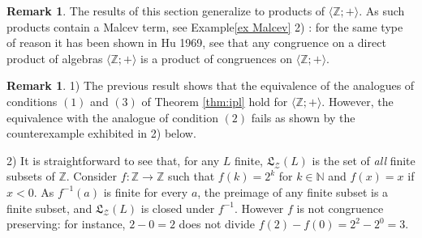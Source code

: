\documentclass[11pt,a4paper]{article}
\theoremstyle{definition} %
\newtheorem{remark}[theorem]{Remark}
\newcommand\+[1]{\mathcal{#1}} %
\newcommand{\N}{{\mathbb N}}     %
\newcommand{\Z}{{\mathbb Z}}     %
\newcommand{\Latt}{{\mathfrak{L}}}
\newcommand{\gen}{\textit{gen}}
\newcommand{\pat}{\color{red}}
\begin{document}
%
\begin{remark}\label{rem prod}
The results of this section generalize to products of $\langle  \Z ;+\rangle$. As such products contain a Malcev term, see Example\ref{ex Malcev} 2) : for the same type of reason it has been shown in Hu 1969, see \cite{H,burris} that any congruence on a direct product of algebras $\langle  \Z ;+\rangle$ is a product of congruences on $\langle  \Z ;+\rangle$.
\end{remark}
%
\begin{remark}\label{r:Nnepasse-pas-aZ}
1) The previous result shows that  the equivalence of the analogues of conditions $(1)$ and  $(3)$ of Theorem \ref{thm:ipl}  
hold for $\langle  \Z ;+\rangle$.%
However,  the equivalence with the analogue of condition $(2)$ %
fails as shown by the counterexample exhibited  in 2) below.
%

2)  It is straightforward to see that, for any   $L$ finite,  $\Latt_{\+Z}(L)$ is the set of {\em all } finite subsets of $\Z$.
 Consider $f:\Z\to\Z$ such that 
$f(k)=2^k$ for $k\in\N$ and $f(x)=x$ if $x<0$.
As $f^{-1}(a)$ is finite for every $a$,  the preimage of any finite subset is a finite subset, and $\Latt_{\+Z}(L)$ is closed under $f^{-1}$. However $f$ is  not congruence preserving: 
for instance, $2-0=2$ does not divide $f(2)-f(0)=2^2-2^0=3$.
%
%
\end{remark}
%
\end{document}
